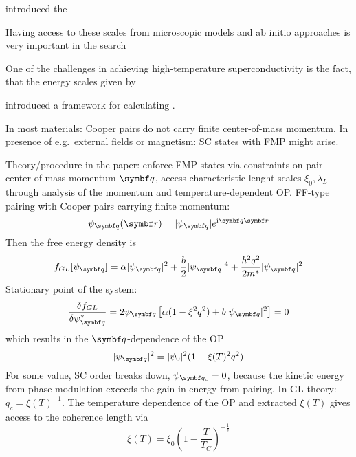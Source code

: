 \documentclass[../notes.tex]{subfiles}
\begin{document}
 introduced the 

Having access to these scales from microscopic models and ab initio approaches is very important in the search 

One of the challenges in achieving high-temperature superconductivity is the fact, that the energy scales given by 

\citeauthor{wittBypassingLatticeBCS2024} introduced a framework for calculating \cite{wittBypassingLatticeBCS2024}.


In most materials: Cooper pairs do not carry finite center-of-mass momentum.
In presence of e.g.\ external fields or magnetism: SC states with FMP might arise.

Theory/procedure in the paper: enforce FMP states via constraints on pair-center-of-mass momentum \(\vb{q}\), access characteristic lenght scales \(\xi_0, \lambda_L\) through analysis of the momentum and temperature-dependent OP\@.
FF-type pairing with Cooper pairs carrying finite momentum:
\begin{equation}
	\psi_{\vb{q}} (\vb{r}) = \vert \psi_{\vb{q}} \vert e^{\iu \vb{q} \vb{r}}
\end{equation}
Then the free energy density is
\begin{equation}
	f_{GL} [\psi_{\vb{q}}] = \alpha \vert \psi_{\vb{q}} \vert^2 + \frac{b}{2} \vert \psi_{\vb{q}} \vert^4 + \frac{\hbar^2 q^2}{2 m^*} \vert \psi_{\vb{q}} \vert^2
\end{equation}
Stationary point of the system:
\begin{equation}
	\fdv{f_{GL}}{\psi_{\vb{q}}^*} = 2 \psi_{\vb{q}} \left[\alpha (1 - \xi^2 q^2) + b \vert \psi_{\vb{q}} \vert^2\right] = 0
\end{equation}
which results in the \(\vb{q}\)-dependence of the OP
\begin{equation}
	\vert \psi_{\vb{q}} \vert^2 = \vert \psi_{0} \vert^2 (1 - \xi(T)^2 q^2)
\end{equation}
For some value, SC order breaks down, \(\psi_{\vb{q}_c} = 0\), because the kinetic energy from phase modulation exceeds the gain in energy from pairing.
In GL theory: \(q_c = \xi(T)^{-1}\).
The temperature dependence of the OP and extracted \(\xi(T)\) gives access to the coherence length via
\begin{equation}
	\xi(T) = \xi_0 (1 - \frac{T}{T_C})^{-\frac{1}{2}}
\end{equation}
\end{document}
